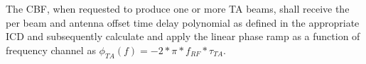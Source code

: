 The CBF, when requested to produce one or more TA beams, shall receive the per
beam and antenna offset time delay polynomial as defined in the appropriate
ICD and subsequently calculate and apply the linear phase ramp as a function
of frequency channel as $\phi_{TA}(f) = -2*\pi*f_{RF}*\tau_{TA}$.
